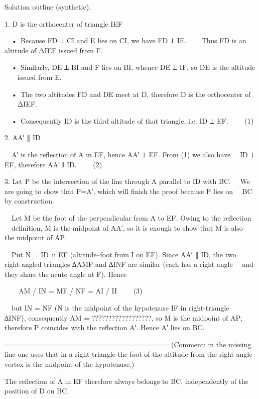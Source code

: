 Solution outline (synthetic).

1.  D is the orthocenter of triangle  IEF  

 • Because FD ⟂ CI and  E lies on  CI, we have FD ⟂ IE.  
   Thus FD is an altitude of  ΔIEF issued from  F.  

 • Similarly, DE ⟂ BI and  F lies on  BI, whence DE ⟂ IF, so DE is the altitude
   issued from  E.  

 • The two altitudes FD and DE meet at D, therefore D is the orthocenter of
   ΔIEF.  

 • Consequently ID is the third altitude of that triangle, i.e.  ID ⟂ EF.   (1)


2.  AA′ ∥ ID  

 A′ is the reflection of A in EF, hence AA′ ⟂ EF.  From (1) we also have
 ID ⟂ EF, therefore AA′ ∥ ID.   (2)


3.  Let P be the intersection of the line through A parallel to ID with BC.
 We are going to show that P=A′, which will finish the proof because P lies on
 BC by construction.

 Let M be the foot of the perpendicular from A to EF.  Owing to the reflection
 definition, M is the midpoint of AA′, so it is enough to show that M is also
 the midpoint of AP.

 Put N = ID ∩ EF (altitude–foot from I on EF).  Since AA′ ∥ ID, the two
 right-angled triangles ∆AMF and ∆INF are similar (each has a right angle
 and they share the acute angle at F).  Hence

  AM / IN = MF / NF = AI / II    (3)

 but IN = NF (N is the midpoint of the hypotenuse IF in right-triangle
 ∆INF), consequently AM = ??????????????????, so M is the midpoint of AP;
 therefore P coincides with the reflection A′.  Hence A′ lies on BC.

─────────────────────────────────
(Comment: in the missing line one uses that in a right triangle the foot of
the altitude from the right-angle vertex is the midpoint of the hypotenuse.)

The reflection of A in EF therefore always belongs to BC, independently of the
position of D on BC.